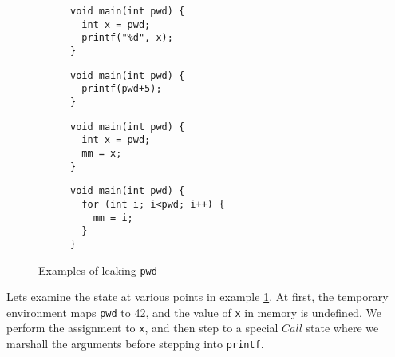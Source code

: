 \documentclass{llncs}
\begin{document}
\begin{figure}
  \begin{subfigure}[t]{0.49\textwidth}
\begin{verbatim}
void main(int pwd) {
  int x = pwd;
  printf("%d", x);
}

\end{verbatim}
\caption{}
\label{fig:ex1}
  \end{subfigure}
  \begin{subfigure}[t]{0.49\textwidth}
\begin{verbatim}
void main(int pwd) {
  printf(pwd+5);
}
\end{verbatim}
\caption{}
\label{fig:ex2}
  \end{subfigure}
  
  \begin{subfigure}[t]{0.49\textwidth}
\begin{verbatim}
void main(int pwd) {
  int x = pwd;
  mm = x;
}
\end{verbatim}
\caption{}
\label{fig:ex3}
  \end{subfigure}
  \begin{subfigure}[t]{0.49\textwidth}
\begin{verbatim}
void main(int pwd) {
  for (int i; i<pwd; i++) {
    mm = i;
  }
}
\end{verbatim}
\caption{}
\label{fig:ex4}
  \end{subfigure}

  \caption{Examples of leaking {\tt pwd}}
  \label{fig:exampleleak}
\end{figure}


Lets examine the state at various points in example \ref{fig:ex1}.
At first, the temporary environment maps {\tt pwd} to 42, and the value of  {\tt x} in memory
is undefined. We perform the assignment to {\tt x}, and then step to a special \(\mathit{Call}\)
state where we marshall the arguments before stepping into {\tt printf}.
\end{document}
